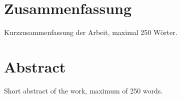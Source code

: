 
\section*{Zusammenfassung}

Kurzzusammenfassung der Arbeit, maximal 250 W\"orter.

\section*{Abstract}

Short abstract of the work, maximum of 250 words.


